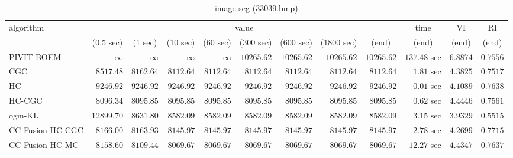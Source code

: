 \begin{table}[H]
\scriptsize
\centering
\caption{image-seg (33039.bmp)}
\label{tab:anytimetable-image-seg-33039.bmp}
\begin{tabular}{lrrrrrrrrrrr}
\toprule
           algorithm &                                   \multicolumn{8}{c}{value} & \multicolumn{1}{c}{time}    & \multicolumn{1}{c}{VI}  & \multicolumn{1}{c}{RI} \\  
\cmidrule(lr){2-9}\cmidrule(lr){10-10} \cmidrule(lr){11-11} \cmidrule(lr){12-12}   
                     & \multicolumn{1}{c}{(0.5 sec)} & \multicolumn{1}{c}{(1 sec)} & \multicolumn{1}{c}{(10 sec)} & \multicolumn{1}{c}{(60 sec)} & \multicolumn{1}{c}{(300 sec)} & \multicolumn{1}{c}{(600 sec)} & \multicolumn{1}{c}{(1800 sec)} & \multicolumn{1}{c}{(end)} & \multicolumn{1}{c}{(end)}    & \multicolumn{1}{c}{(end)}   & \multicolumn{1}{c}{(end)}  \\ \midrule 
          PIVIT-BOEM & $\infty$ & $\infty$ & $\infty$ & $\infty$ & $     10265.62$ & $     10265.62$ & $     10265.62$ & $     10265.62$ & $       137.48$ sec    & $       6.8874$  & $       0.7556$ \\ 
                 CGC & $      8517.48$ & $      8162.64$ & $      8112.64$ & $      8112.64$ & $      8112.64$ & $      8112.64$ & $      8112.64$ & $      8112.64$ & $         1.81$ sec    & $       4.3825$  & $       0.7517$ \\ 
                  HC & $      9246.92$ & $      9246.92$ & $      9246.92$ & $      9246.92$ & $      9246.92$ & $      9246.92$ & $      9246.92$ & $      9246.92$ & $         0.01$ sec    & $       4.1089$  & $       0.7638$ \\ 
              HC-CGC & $      8096.34$ & $      8095.85$ & $      8095.85$ & $      8095.85$ & $      8095.85$ & $      8095.85$ & $      8095.85$ & $      8095.85$ & $         0.62$ sec    & $       4.4446$  & $       0.7561$ \\ 
              ogm-KL & $     12899.70$ & $      8631.80$ & $      8582.09$ & $      8582.09$ & $      8582.09$ & $      8582.09$ & $      8582.09$ & $      8582.09$ & $         3.15$ sec    & $       3.9329$  & $       0.5515$ \\ 
    CC-Fusion-HC-CGC & $      8166.00$ & $      8163.93$ & $      8145.97$ & $      8145.97$ & $      8145.97$ & $      8145.97$ & $      8145.97$ & $      8145.97$ & $         2.78$ sec    & $       4.2699$  & $       0.7715$ \\ 
     CC-Fusion-HC-MC & $      8158.60$ & $      8109.44$ & $      8069.67$ & $      8069.67$ & $      8069.67$ & $      8069.67$ & $      8069.67$ & $      8069.67$ & $        12.27$ sec    & $       4.4347$  & $       0.7637$ \\ 

\end{tabular}
\end{table}
